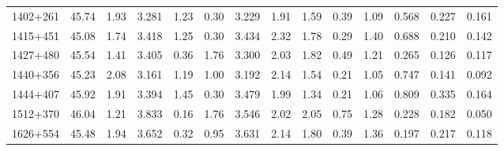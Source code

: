 \begin{tabular}{lrlrrrllrllllr}
 1402+261 &      45.74 &  1.93 &           3.281 &          1.23 &          0.30 &         3.229 &         1.91 &       1.59 &        0.39 &        1.09 &        0.568 &      0.227 &          0.161 \\
 1415+451 &      45.08 &  1.74 &           3.418 &          1.25 &          0.30 &         3.434 &         2.32 &       1.78 &        0.29 &        1.40 &        0.688 &      0.210 &          0.142 \\
 1427+480 &      45.54 &  1.41 &           3.405 &          0.36 &          1.76 &         3.300 &         2.03 &       1.82 &        0.49 &        1.21 &        0.265 &      0.126 &          0.117 \\
 1440+356 &      45.23 &  2.08 &           3.161 &          1.19 &          1.00 &         3.192 &         2.14 &       1.54 &        0.21 &        1.05 &        0.747 &      0.141 &          0.092 \\
 1444+407 &      45.92 &  1.91 &           3.394 &          1.45 &          0.30 &         3.479 &         1.99 &       1.34 &        0.21 &        1.06 &        0.809 &      0.335 &          0.164 \\
 1512+370 &      46.04 &  1.21 &           3.833 &          0.16 &          1.76 &         3.546 &         2.02 &       2.05 &        0.75 &        1.28 &        0.228 &      0.182 &          0.050 \\
 1626+554 &      45.48 &  1.94 &           3.652 &          0.32 &          0.95 &         3.631 &         2.14 &       1.80 &        0.39 &        1.36 &        0.197 &      0.217 &          0.118 \\
\bottomrule
\end{tabular}
